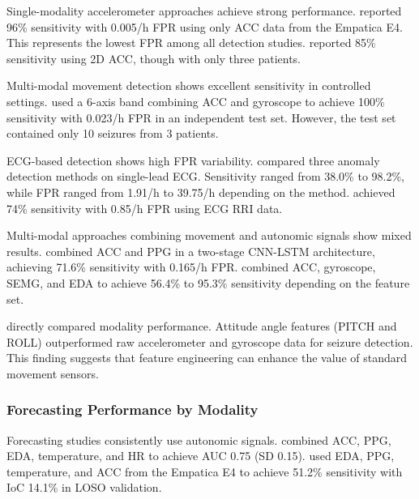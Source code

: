 Single-modality accelerometer approaches achieve strong performance. \textcite{spahrDeepLearningbasedDetection2025} reported 96\% sensitivity with 0.005/h FPR using only ACC data from the Empatica E4. This represents the lowest FPR among all detection studies. \textcite{borujenyDetectionEpilepticSeizure2013} reported 85\% sensitivity using 2D ACC, though with only three patients.

Multi-modal movement detection shows excellent sensitivity in controlled settings. \textcite{fineWearableDeviceSeizure2025} used a 6-axis band combining ACC and gyroscope to achieve 100\% sensitivity with 0.023/h FPR in an independent test set. However, the test set contained only 10 seizures from 3 patients.

ECG-based detection shows high FPR variability. \textcite{reintjesECGBasedDetectionEpileptic2025} compared three anomaly detection methods on single-lead ECG. Sensitivity ranged from 38.0\% to 98.2\%, while FPR ranged from 1.91/h to 39.75/h depending on the method. \textcite{odeDevelopmentEpilepticSeizure2023} achieved 74\% sensitivity with 0.85/h FPR using ECG RRI data.

Multi-modal approaches combining movement and autonomic signals show mixed results. \textcite{dongTwoLayerEnsembleMethod2022} combined ACC and PPG in a two-stage CNN-LSTM architecture, achieving 71.6\% sensitivity with 0.165/h FPR. \textcite{wangDevelopmentWearableSeizure2025} combined ACC, gyroscope, SEMG, and EDA to achieve 56.4\% to 95.3\% sensitivity depending on the feature set.

\textcite{wangDevelopmentWearableSeizure2025} directly compared modality performance. Attitude angle features (PITCH and ROLL) outperformed raw accelerometer and gyroscope data for seizure detection. This finding suggests that feature engineering can enhance the value of standard movement sensors.

\subsubsection{Forecasting Performance by Modality}

Forecasting studies consistently use autonomic signals. \textcite{nasseriAmbulatorySeizureForecasting2021} combined ACC, PPG, EDA, temperature, and HR to achieve AUC 0.75 (SD 0.15). \textcite{meiselMachineLearningWristband2020} used EDA, PPG, temperature, and ACC from the Empatica E4 to achieve 51.2\% sensitivity with IoC 14.1\% in LOSO validation.

